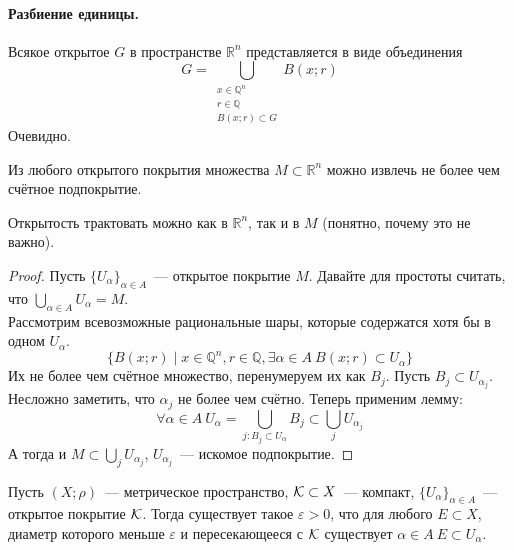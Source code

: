 \documentclass{article}
\let\eps\varepsilon
\begin{document}
    \paragraph{Разбиение единицы.}
    \begin{lemma}
        Всякое открытое $G$ в пространстве $\mathbb R^n$ представляется в виде объединения
        $$
        G=\bigcup\limits_{\substack{x\in\mathbb Q^n\\r\in\mathbb Q\\B(x;r)\subset G}}B(x;r)
        $$
        Очевидно.
    \end{lemma}
    \begin{theorem}
        Из любого открытого покрытия множества $M\subset\mathbb R^n$ можно извлечь не более чем счётное подпокрытие.
    \end{theorem}
    \begin{remark}
        Открытость трактовать можно как в $\mathbb R^n$, так и в $M$ (понятно, почему это не важно).
    \end{remark}
    \begin{proof}
        Пусть $\{U_\alpha\}_{\alpha\in A}$~--- открытое покрытие $M$. Давайте для простоты считать, что $\bigcup\limits_{\alpha\in A}U_\alpha=M$.\\
        Рассмотрим всевозможные рациональные шары, которые содержатся хотя бы в одном $U_\alpha$.
        $$
        \{B(x;r)\mid x\in\mathbb Q^n,r\in\mathbb Q,\exists\alpha\in A~B(x;r)\subset U_\alpha\}
        $$
        Их не более чем счётное множество, перенумеруем их как $B_j$. Пусть $B_j\subset U_{\alpha_j}$. Несложно заметить, что $\alpha_j$ не более чем счётно. Теперь применим лемму:
        $$
        \forall\alpha\in A~U_\alpha=\bigcup\limits_{j:B_j\subset U_\alpha}B_j\subset\bigcup\limits_jU_{\alpha_j}
        $$
        А тогда и $M\subset\bigcup\limits_jU_{\alpha_j}$, $U_{\alpha_j}$~--- искомое подпокрытие.
    \end{proof}
    \begin{lemma}
        \label{Лемма Лебега о компакте}
        Пусть $(X;\rho)$~--- метрическое пространство, ${\mathcal{K}}\subset X$~--- компакт, $\{U_\alpha\}_{\alpha\in A}$~--- открытое покрытие ${\mathcal{K}}$. Тогда существует такое $\eps>0$, что для любого $E\subset X$, диаметр которого меньше $\eps$ и пересекающееся с ${\mathcal{K}}$ существует $\alpha\in A~E\subset U_\alpha$.
    \end{lemma}
\end{document}

